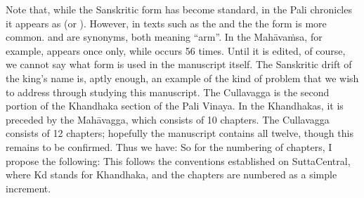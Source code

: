 \markdownRendererBlockQuoteEnd \markdownRendererInterblockSeparator
{}Note that, while the Sanskritic form  has become standard, in the Pali chronicles it appears as  (or ). However, in texts such as the  and the  the form  is more common.  and  are synonyms, both meaning “arm”. In the Mahāvaṁsa, for example,  appears once only, while  occurs 56 times. Until it is edited, of course, we cannot say what form is used in the manuscript itself. The Sanskritic drift of the king’s name is, aptly enough, an example of the kind of problem that we wish to address through studying this manuscript.\markdownRendererInterblockSeparator
{}\markdownRendererInterblockSeparator
{}The Cullavagga is the second portion of the Khandhaka section of the Pali Vinaya. In the Khandhakas, it is preceded by the Mahāvagga, which consists of 10 chapters. The Cullavagga consists of 12 chapters; hopefully the manuscript contains all twelve, though this remains to be confirmed.\markdownRendererInterblockSeparator
{}Thus we have:\markdownRendererInterblockSeparator
{}\markdownRendererInterblockSeparator
{}So for the numbering of chapters, I propose the following:\markdownRendererInterblockSeparator
{}\markdownRendererBlockQuoteBegin
{}
\markdownRendererBlockQuoteEnd \markdownRendererInterblockSeparator
{}This follows the conventions established on SuttaCentral, where Kd stands for Khandhaka, and the chapters are numbered as a simple increment.\markdownRendererInterblockSeparator
